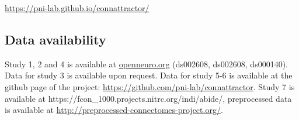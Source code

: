 \documentclass{article}
\begin{document}
\href{https://pni-lab.github.io/connattractor/}{https://pni-lab.github.io/connattractor/}

\subsection{Data availability}

Study 1, 2 and 4 is available at \href{http://openneuro.org}{openneuro.org} (ds002608, ds002608, ds000140). Data for study 3 is available upon request. Data for study 5-6 is available at the github page of the project: \href{https://github.com/pni-lab/connattractor}{https://github.com/pni-lab/connattractor}. Study 7 is available at https://fcon\_1000.projects.nitrc.org/indi/abide/, preprocessed data is available at \href{http://preprocessed-connectomes-project.org/}{http://preprocessed-connectomes-project.org/}.
\printglossaries





\end{document}
